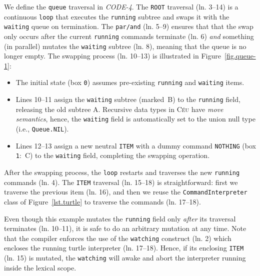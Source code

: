\documentclass{sig-alternate}
\newcommand{\CEU}{\textsc{C\'{e}u}\xspace}
\newcommand{\code}[1] {{\small{\texttt{#1}}}}
\newcommand{\MM}[1] {\textcircled{\tiny{\textsf{#1}}}}
\begin{document}
We define the \code{queue} traversal in \emph{CODE-4}.
%
The \code{ROOT} traversal (ln. 3--14) is a continuous \code{loop} that 
executes the \code{running} subtree and swaps it with the \code{waiting} queue 
on termination.
The \code{par/and} (ln. 5--9) ensures that that the swap only occurs after 
the current \code{running} commands terminate (ln. 6) \emph{and} something (in 
parallel) mutates the \code{waiting} subtree (ln. 8), meaning that the queue 
is no longer empty.
The swapping process (ln. 10--13) is illustrated in Figure~\ref{fig.queue-1}: 
%
\begin{itemize}
%
\item The initial state (box \code{0}) assumes pre-existing \code{running} and 
\code{waiting} items.
%
\item Lines 10--11 assign the \code{waiting} subtree (marked~\MM{B}) to the 
\code{running} field, releasing the old subtree \MM{A}.
Recursive data types in \CEU have \emph{move semantics}, hence, the 
\code{waiting} field is automatically set to the union null type (i.e., 
\code{Queue.NIL}).
%
\item Lines 12--13 assign a new neutral \code{ITEM} with a dummy command 
\code{NOTHING} (box \code{1}:~\MM{C}) to the \code{waiting} field, completing 
the swapping operation.
%
\end{itemize}
%
After the swapping process, the \code{loop} restarts and traverses the new 
\code{running} commands (ln. 4).
%
The \code{ITEM} traversal (ln. 15--18) is straightforward:
first we traverse the previous item (ln. 16), and then we reuse the 
\code{CommandInterpreter} class of Figure~\ref{lst.turtle} to traverse the 
commands (ln. 17--18).

Even though this example mutates the \code{running} field only \emph{after} its 
traversal terminates (ln. 10--11), it is safe to do an arbitrary mutation at 
any time.
Note that the compiler enforces the use of the \code{watching} construct (ln. 
2) which encloses the running turtle interpreter (ln. 17--18).
Hence, if its enclosing \code{ITEM} (ln. 15) is mutated, the \code{watching} 
will awake and abort the interpreter running inside the lexical scope.
\end{document}

